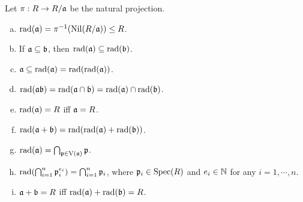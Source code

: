 \begin{fact}
    Let $\pi: R \to R/\mathfrak{a}$ be the natural projection.
    \begin{enumerate}[(a)]
        \item $\operatorname{rad}(\mathfrak{a}) = \pi^{-1}(\operatorname{Nil}(R/\mathfrak{a})) \leq R$. 
        \item If $\mathfrak{a} \subseteq \mathfrak{b}$, then $\operatorname{rad}(\mathfrak{a}) \subseteq \operatorname{rad}(\mathfrak{b})$. 
        \item $\mathfrak{a} \subseteq \operatorname{rad}(\mathfrak{a}) = \operatorname{rad}(\operatorname{rad}(\mathfrak{a}))$. 
        \item $\operatorname{rad}(\mathfrak{a}\mathfrak{b}) = \operatorname{rad}(\mathfrak{a} \cap \mathfrak{b}) = \operatorname{rad}(\mathfrak{a}) \cap \operatorname{rad}(\mathfrak{b})$.
        \item $\operatorname{rad}(\mathfrak{a}) = R$ iff $\mathfrak{a} = R$.
        \item $\operatorname{rad}(\mathfrak{a} + \mathfrak{b}) = \operatorname{rad}(\operatorname{rad}(\mathfrak{a}) + \operatorname{rad}(\mathfrak{b}))$.
        \item $\operatorname{rad}(\mathfrak{a}) = \bigcap_{\mathfrak{p} \in \operatorname{V}(\mathfrak{a})} \mathfrak{p}$. 
        \item $\operatorname{rad}(\bigcap_{i=1}^n \mathfrak{p}_i^{e_i}) = \bigcap_{i=1}^n \mathfrak{p}_i$, where $\mathfrak{p}_i \in \operatorname{Spec}(R)$ and $e_i \in \mathbb{N}$ for any $i = 1,\cdots,n$.
        \item $\mathfrak{a} + \mathfrak{b} = R$ iff $\operatorname{rad}(\mathfrak{a}) + \operatorname{rad}(\mathfrak{b}) = R$. 
    \end{enumerate}
\end{fact}


